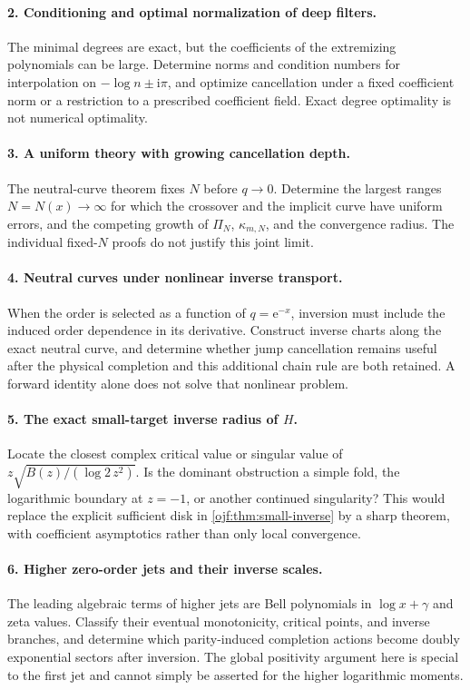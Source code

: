 \documentclass[11pt,a4paper]{article}
\numberwithin{equation}{section}
\theoremstyle{definition}\newtheorem{definition}[theorem]{Definition}
\theoremstyle{remark}\newtheorem{remark}[theorem]{Remark}
\newcommand{\ee}{\mathrm e}\newcommand{\ii}{\mathrm i}\newcommand{\dd}{\,\mathrm d}
\begin{document}
\paragraph{2. Conditioning and optimal normalization of deep filters.}
The minimal degrees are exact, but the coefficients of the extremizing
polynomials can be large. Determine norms and condition numbers for
interpolation on $-\log n\pm\ii\pi$, and optimize cancellation under a
fixed coefficient norm or a restriction to a prescribed coefficient
field. Exact degree optimality is not numerical optimality.

\paragraph{3. A uniform theory with growing cancellation depth.}
The neutral-curve theorem fixes $N$ before $q\to0$. Determine the
largest ranges $N=N(x)\to\infty$ for which the crossover and the implicit
curve have uniform errors, and the competing growth of $\Pi_N$,
$\kappa_{m,N}$, and the convergence radius. The individual fixed-$N$
proofs do not justify this joint limit.

\paragraph{4. Neutral curves under nonlinear inverse transport.}
When the order is selected as a function of $q=\ee^{-x}$, inversion
must include the induced order dependence in its derivative. Construct
inverse charts along the exact neutral curve, and determine whether
jump cancellation remains useful after the physical completion and
this additional chain rule are both retained. A forward identity alone
does not solve that nonlinear problem.

\paragraph{5. The exact small-target inverse radius of $H$.}
Locate the closest complex critical value or singular value of
$z\sqrt{B(z)/(\log2\,z^2)}$. Is the dominant obstruction a simple fold,
the logarithmic boundary at $z=-1$, or another continued singularity?
This would replace the explicit sufficient disk in
\cref{ojf:thm:small-inverse} by a sharp theorem, with coefficient
asymptotics rather than only local convergence.

\paragraph{6. Higher zero-order jets and their inverse scales.}
The leading algebraic terms of higher jets are Bell polynomials in
$\log x+\gamma$ and zeta values. Classify their eventual monotonicity,
critical points, and inverse branches, and determine which parity-induced
completion actions become doubly exponential sectors after inversion.
The global positivity argument here is special to the first jet and
cannot simply be asserted for the higher logarithmic moments.
\end{document}
